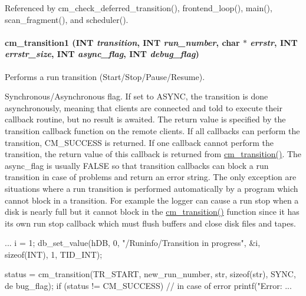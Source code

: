Referenced by cm\_\-check\_\-deferred\_\-transition(), frontend\_\-loop(), main(), scan\_\-fragment(), and scheduler().
\paragraph[{cm\_\-transition1}]{ cm\_\-transition1 ({\bf INT} {\em transition}, \/  {\bf INT} {\em run\_\-number}, \/  char $\ast$ {\em errstr}, \/  {\bf INT} {\em errstr\_\-size}, \/  {\bf INT} {\em async\_\-flag}, \/  {\bf INT} {\em debug\_\-flag})}\hfill\label{group__cmfunctionc_ga0dd9a488ef81843f8a64c7930ad40f06}
Performs a run transition (Start/Stop/Pause/Resume).

Synchronous/Asynchronous flag. If set to ASYNC, the transition is done asynchronously, meaning that clients are connected and told to execute their callback routine, but no result is awaited. The return value is specified by the transition callback function on the remote clients. If all callbacks can perform the transition, CM\_\-SUCCESS is returned. If one callback cannot perform the transition, the return value of this callback is returned from \hyperlink{group__cmfunctionc_ga376defd443d6bdfcca3830b99986a48d}{cm\_\-transition()}. The async\_\-flag is usually FALSE so that transition callbacks can block a run transition in case of problems and return an error string. The only exception are situations where a run transition is performed automatically by a program which cannot block in a transition. For example the logger can cause a run stop when a disk is nearly full but it cannot block in the \hyperlink{group__cmfunctionc_ga376defd443d6bdfcca3830b99986a48d}{cm\_\-transition()} function since it has its own run stop callback which must flush buffers and close disk files and tapes. 
\begin{DoxyCode}
...
    i = 1;
    db_set_value(hDB, 0, "/Runinfo/Transition in progress", &i, sizeof(INT), 1, 
      TID_INT);

      status = cm_transition(TR_START, new_run_number, str, sizeof(str), SYNC, de
      bug_flag);
      if (status != CM_SUCCESS)
      {
        // in case of error
        printf("Error: %
      }
    ...
\end{DoxyCode}
 
